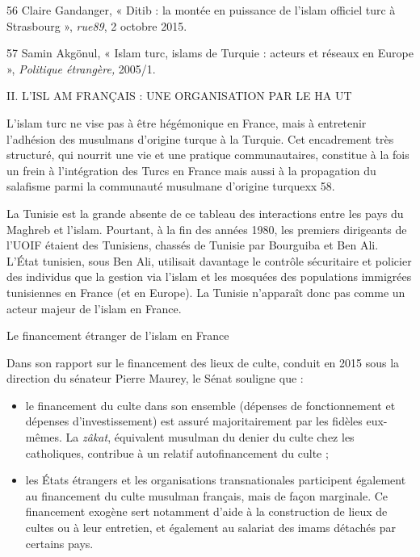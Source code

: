 56 Claire Gandanger, « Ditib : la montée en puissance de l'islam
officiel turc à Strasbourg », \emph{rue89}, 2 octobre 2015.

57 Samin Akgönul, « Islam turc, islams de Turquie : acteurs et réseaux
en Europe », \emph{Politique étrangère,} 2005/1.

II. L'ISL AM FRANÇAIS : UNE ORGANISATION PAR LE HA UT

L'islam turc ne vise pas à être hégémonique en France, mais à entretenir
l'adhésion des musulmans d'origine turque à la Turquie. Cet encadrement
très structuré, qui nourrit une vie et une pratique communautaires,
constitue à la fois un frein à l'intégration des Turcs en France mais
aussi à la propagation du salafisme parmi la communauté musulmane
d'origine turquexx 58.

La Tunisie est la grande absente de ce tableau des interactions entre
les pays du Maghreb et l'islam. Pourtant, à la fin des années 1980, les
premiers dirigeants de l'UOIF étaient des Tunisiens, chassés de Tunisie
par Bourguiba et Ben Ali. L'État tunisien, sous Ben Ali, utilisait
davantage le contrôle sécuritaire et policier des individus que la
gestion via l'islam et les mosquées des populations immigrées
tunisiennes en France (et en Europe). La Tunisie n'apparaît donc pas
comme un acteur majeur de l'islam en France.


Le financement étranger de l'islam en France


Dans son rapport sur le financement des lieux de culte, conduit en 2015
sous la direction du sénateur Pierre Maurey, le Sénat souligne que :


\begin{itemize}
\item
  le financement du culte dans son ensemble (dépenses de fonctionnement
  et dépenses d'investissement) est assuré majoritairement par les
  fidèles eux- mêmes. La \emph{zâkat}, équivalent musulman du denier du
  culte chez les catholiques, contribue à un relatif autofinancement du
  culte ;
\item
  
  les États étrangers et les organisations transnationales participent
  également au financement du culte musulman français, mais de façon
  marginale. Ce financement exogène sert notamment d'aide à la
  construction de lieux de cultes ou à leur entretien, et également au
  salariat des imams détachés par certains pays.
  
\end{itemize}


